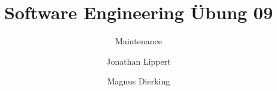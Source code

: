 \documentclass[
	ngerman,
	twoside,
	pdfa=false,
	ruledheaders=section,%
	class=report,%
	thesis={type=Übung},%
	accentcolor=TUDa-9d,%
	custommargins=false,%
	marginpar=false,%
	parskip=half-,%
	fontsize=11pt,%
]{tudapub}
\begin{document}
	\title{Software Engineering Übung 09}
	\subtitle{Maintenance}
	\author[J. Lippert \and M. Dierking]
	{Jonathan Lippert \and Magnus Dierking}

	
	\submissiondate{\today}
	

	\maketitle


%	

	\newpage
	\setcounter{page}{1}
	

     
     

	

	\printbibliography %
	
%	
	
\end{document}
